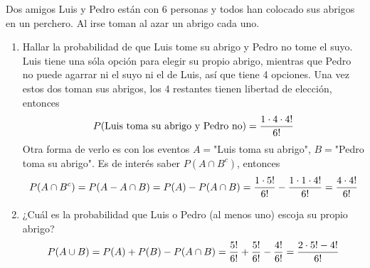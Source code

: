 \item Dos amigos Luis y Pedro están con 6 personas y todos han colocado sus abrigos en un perchero. Al irse toman al azar un abrigo cada uno.
    \begin{enumerate}
        \item Hallar la probabilidad de que Luis tome su abrigo y Pedro no tome el suyo.\e\\
            Luis tiene una sóla opción para elegir su propio abrigo, mientras que Pedro no puede agarrar ni el suyo ni el de Luis, así que tiene 4 opciones. Una vez estos dos toman sus abrigos, los 4 restantes tienen libertad de elección, entonces \[P(\text{Luis toma su abrigo y Pedro no})=\frac{1\cdot4\cdot4!}{6!}\]
            Otra forma de verlo es con los eventos $A=$"Luis toma su abrigo", $B=$"Pedro toma su abrigo". Es de interés saber $P(A\cap B^c)$, entonces\[P(A\cap B^c)=P(A-A\cap B)=P(A)-P(A\cap B)=\frac{1\cdot5!}{6!}-\frac{1\cdot1\cdot4!}{6!}=\frac{4\cdot4!}{6!}\]
        \item ¿Cuál es la probabilidad que Luis o Pedro (al menos uno) escoja su propio abrigo?
            \[P(A\cup B)=P(A)+P(B)-P(A\cap B)=\frac{5!}{6!}+\frac{5!}{6!}-\frac{4!}{6!}=\frac{2\cdot5!-4!}{6!}\]
    \end{enumerate}